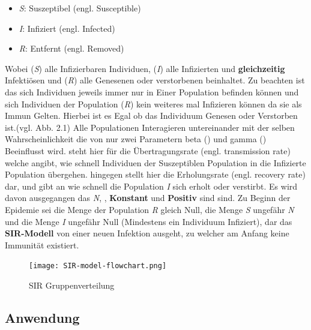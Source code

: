 \documentclass[12pt]{scrartcl} %
\begin{document}
\begin{itemize}
	\item \textit{S}: Suszeptibel (engl. Susceptible)
	\item \textit{I}: Infiziert (engl. Infected)
	\item \textit{R}: Entfernt (engl. Removed) 	%
\end{itemize}
\normalsize

Wobei (\textit{S}) alle Infizierbaren Individuen, (\textit{I}) alle Infizierten und \textbf{gleichzeitig} Infektiösen und (\textit{R}) alle Genesenen oder verstorbenen beinhaltet.  Zu beachten ist das sich Individuen jeweils immer nur in Einer Population befinden können und sich Individuen der Population 
(\textit{R}) kein weiteres mal Infizieren können da sie als Immun Gelten. Hierbei ist es Egal ob das Individuum Genesen oder Verstorben ist.(vgl. Abb. 2.1) \cite[vgl.]{4}
Alle Populationen Interagieren untereinander mit der selben Wahrscheinlichkeit die von nur zwei Parametern beta (\textbeta) und gamma (\textgamma) Beeinflusst wird. 
\textbeta \space steht hier für die Übertragungsrate (engl. transmission rate) welche angibt, wie schnell Individuen der Suszeptiblen Population in die Infizierte Population übergehen. 
\textgamma \space hingegen stellt hier die Erholungsrate (engl. recovery rate) dar, und gibt an wie schnell die Population \textit{I} sich erholt oder verstirbt.
Es wird davon ausgegangen das \textit{N}, \textbeta, \textgamma \space \textbf{Konstant} und \textbf{Positiv} sind sind.
Zu Beginn der Epidemie sei die Menge der Population \textsl{R} gleich Null, die Menge \textsl{S} ungefähr \textit{N} und die Menge \textit{I} ungefähr Null (Mindestens ein Individuum Infiziert), dar das \textbf{SIR-Modell} von einer neuen Infektion ausgeht, zu welcher am Anfang keine Immunität existiert.

	\begin{figure}[h]
	\centering
	\texttt{[image: SIR-model-flowchart.png]} 
	\caption{SIR Gruppenverteilung}
	\end{figure}


\subsection{Anwendung}
\end{document}
